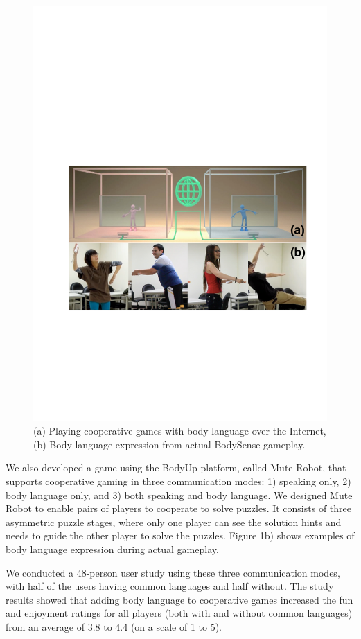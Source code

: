 \begin{figure}[t]
\centering
\includegraphics[width=0.9\columnwidth]{Figures/Topic.pdf}
\caption{(a) Playing cooperative games with body language over the Internet, (b) Body language expression from actual BodySense gameplay.}
\label{fig:Topic}
\end{figure}

We also developed a game using the BodyUp platform, called Mute Robot, that supports cooperative gaming in three communication modes: 1) speaking only, 2) body language only, and 3) both speaking and body language. We designed Mute Robot to enable pairs of players to cooperate to solve puzzles. It consists of three asymmetric puzzle stages, where only one player can see the solution hints and needs to guide the other player to solve the puzzles. Figure 1b) shows examples of body language expression during actual gameplay.

We conducted a 48-person user study using these three communication modes, with half of the users having common languages and half without. The study results showed that adding body language to cooperative games increased the fun and enjoyment ratings for all players (both with and without common languages) from an average of 3.8 to 4.4 (on a scale of 1 to 5). 

